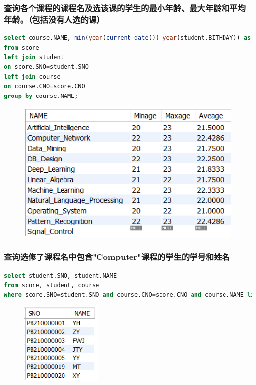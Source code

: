 \documentclass{ctexart}
\begin{document}
\subsubsection{查询各个课程的课程名及选该课的学生的最小年龄、最大年龄和平均年龄。（包括没有人选的课）}
\begin{lstlisting}[language=sql]
select course.NAME, min(year(current_date())-year(student.BITHDAY)) as Minage,  max(year(current_date())-year(student.BITHDAY)) as Maxage, avg(year(current_date())-year(student.BITHDAY)) as aveage
from score
left join student
on score.SNO=student.SNO
left join course 
on course.CNO=score.CNO
group by course.NAME;
\end{lstlisting}
\begin{figure}[H]
	\centering 
	\includegraphics[height=7cm,width=14cm]{42.png}
	\end{figure}
\subsubsection{查询选修了课程名中包含"Computer"课程的学生的学号和姓名}
\begin{lstlisting}[language=sql]
select student.SNO, student.NAME
from score, student, course 
where score.SNO=student.SNO and course.CNO=score.CNO and course.NAME like 'Computer%';
\end{lstlisting}
\begin{figure}[H]
	\centering 
	\includegraphics[height=4cm,width=4cm]{43.png}
	\end{figure}
\end{document}
